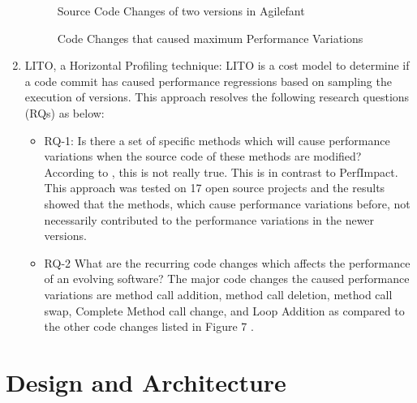 \documentclass[article,type=msc,colorback,12pt,accentcolor=tud7b,table]{tudthesis}
\begin{document}
\begin{enumerate}
 \begin{figure}
 \begin{center}
  \makebox[\textwidth]{\texttt{[image: B1]}}
  \makebox[\textwidth]{\texttt{[image: B2]}}
\end{center}
\caption{Source Code Changes of two versions in Agilefant \cite{luomining}}
\end{figure}

 \begin{figure}
 \begin{center}
  \makebox[\textwidth]{\texttt{[image: B3]}}
\end{center}
\caption{Code Changes that caused maximum Performance Variations \cite{sandoval2016learning}}
\end{figure}

\item{LITO, a Horizontal Profiling technique:} 
LITO is a cost model to determine if a code commit has caused performance regressions based on sampling the execution of versions. This approach resolves the following research questions (RQs) as below:

\begin{itemize}

\item RQ-1: Is there a set of specific methods which will cause performance variations when the source code of these methods are modified? According to \cite{sandoval2016learning}, this is not really true. This is in contrast to PerfImpact. This approach was tested on 17 open source projects and the results showed that the methods, which cause performance variations before, not necessarily contributed to the performance variations in the newer versions.

\item RQ-2  What are the recurring code changes which affects the performance of an evolving software? The major code changes the caused performance variations are method call addition, method call deletion, method call swap, Complete Method call change, and Loop Addition  as compared to the other code changes listed in Figure 7 \cite{sandoval2016learning}.

\end{itemize}
\end{enumerate}	
	
 \cleardoublepage
 \section{Design and Architecture}	
 
\end{document}
